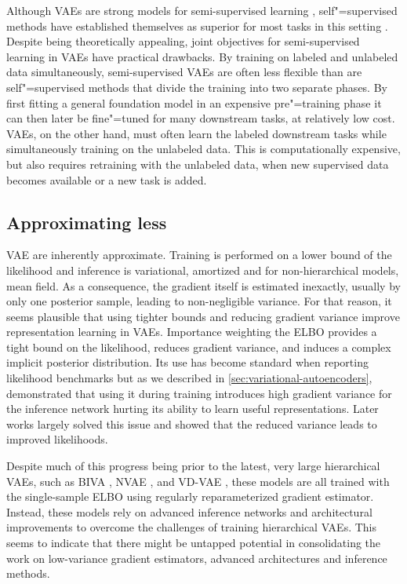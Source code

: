 Although VAEs are strong models for semi-supervised learning \parencite{kingma_semi-supervised_2014,kingma_improved_2016,maaloe_biva_2019}, self"=supervised methods have established themselves as superior for most tasks in this setting \cite{baevski_wav2vec_2020,jiang_speech_2021, liu_learning_2023}. 
Despite being theoretically appealing, joint objectives for semi-supervised learning in VAEs have practical drawbacks. By training on labeled and unlabeled data simultaneously, semi-supervised VAEs are often less flexible than are self"=supervised methods that divide the training into two separate phases. By first fitting a general foundation model in an expensive pre"=training phase it can then later be fine"=tuned for many downstream tasks, at relatively low cost. 
VAEs, on the other hand, must often learn the labeled downstream tasks while simultaneously training on the unlabeled data. This is computationally expensive, but also requires retraining with the unlabeled data, when new supervised data becomes available or a new task is added. 


\subsection{Approximating less}
VAE are inherently approximate. Training is performed on a lower bound of the likelihood and inference is variational, amortized and for non-hierarchical models, mean field. As a consequence, the gradient itself is estimated inexactly, usually by only one posterior sample, leading to non-negligible variance. 
For that reason, it seems plausible that using tighter bounds and reducing gradient variance improve representation learning in VAEs. 
Importance weighting the ELBO \parencite{burda_importance_2016} provides a tight bound on the likelihood, reduces gradient variance, and induces a complex implicit posterior distribution. 
Its use has become standard when reporting likelihood benchmarks but as we described in \cref{sec:variational-autoencoders}, \textcite{rainforth_tighter_2019} demonstrated that using it during training introduces high gradient variance for the inference network hurting its ability to learn useful representations. Later works largely solved this issue \parencite{roeder_sticking_2017,tucker_doubly_2019,bauer_generalized_2021} and showed that the reduced variance leads to improved likelihoods. 

Despite much of this progress being prior to the latest, very large hierarchical VAEs, such as BIVA \parencite{maaloe_biva_2019}, NVAE \parencite{vahdat_nvae_2020}, and VD-VAE \parencite{child_very_2021}, these models are all trained with the single-sample ELBO using regularly reparameterized gradient estimator. Instead, these models rely on advanced inference networks \parencite{maaloe_biva_2019} and architectural improvements \parencite{vahdat_nvae_2020, child_very_2021} to overcome the challenges of training hierarchical VAEs. 
This seems to indicate that there might be untapped potential in consolidating the work on low-variance gradient estimators, advanced architectures and inference methods.


